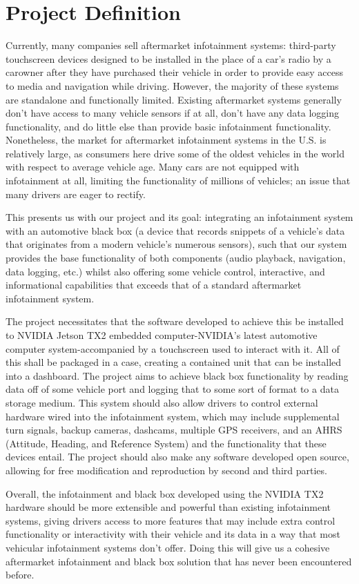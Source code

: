 \documentclass[onecolumn, draftclsnofoot,10pt, compsoc]{IEEEtran}
\begin{document}
\section{Project Definition}
Currently, many companies sell aftermarket infotainment systems: third-party touchscreen devices designed to be installed in the place of a car's radio by a carowner after they have purchased their vehicle in order to provide easy access to media and navigation while driving. However, the majority of these systems are standalone and functionally limited. Existing aftermarket systems generally don't have access to many vehicle sensors if at all, don't have any data logging functionality, and do little else than provide basic infotainment functionality. Nonetheless, the market for aftermarket infotainment systems in the U.S. is relatively large, as consumers here drive some of the oldest vehicles in the world with respect to average vehicle age. Many cars are not equipped with infotainment at all, limiting the functionality of millions of vehicles; an issue that many drivers are eager to rectify.\par
This presents us with our project and its goal: integrating an infotainment system with an automotive black box (a device that records snippets of a vehicle's data that originates from a modern vehicle's numerous sensors), such that our system provides the base functionality of both components (audio playback, navigation, data logging, etc.) whilst also offering some vehicle control, interactive, and informational capabilities that exceeds that of a standard aftermarket infotainment system.\par
The project necessitates that the software developed to achieve this be installed to NVIDIA Jetson TX2 embedded computer\--NVIDIA's latest automotive computer system\--accompanied by a touchscreen used to interact with it. All of this shall be packaged in a case, creating a contained unit that can be installed into a dashboard. The project aims to achieve black box functionality by reading data off of some vehicle port and logging that to some sort of format to a data storage medium. This system should also allow drivers to control external hardware wired into the infotainment system, which may include supplemental turn signals, backup cameras, dashcams, multiple GPS receivers, and an AHRS (Attitude, Heading, and Reference System) and the functionality that these devices entail. The project should also make any software developed open source, allowing for free modification and reproduction by second and third parties.\par
Overall, the infotainment and black box developed using the NVIDIA TX2 hardware should be more extensible and powerful than existing infotainment systems, giving drivers access to more features that may include extra control functionality or interactivity with their vehicle and its data in a way that most vehicular infotainment systems don't offer. Doing this will give us a cohesive aftermarket infotainment and black box solution that has never been encountered before.\par
\end{document}
